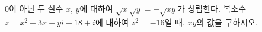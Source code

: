 $0$이 아닌 두 실수 $x$, $y$에 대하여 $\sqrt{x}\sqrt{y}=-\sqrt{xy}$가 성립한다. 복소수 $z=x^2+3x-yi-18+i$에 대하여 $z^2=-16$일 때, $xy$의 값을 구하시오.

